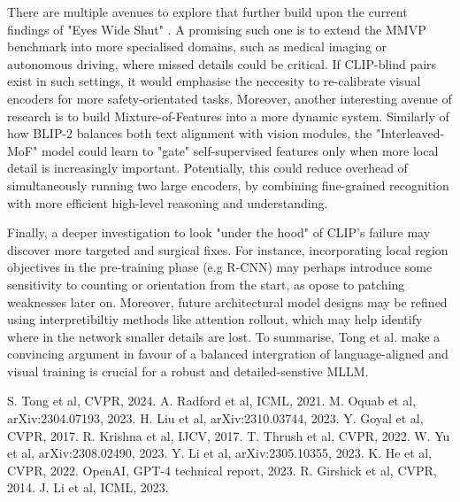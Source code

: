 \documentclass[11pt]{article}
\begin{document}
There are multiple avenues to explore that further build upon the current findings of "Eyes Wide Shut" \cite{Tong2024CVPR}. A promising such one is to extend the MMVP benchmark into more specialised domains, such as medical imaging or autonomous driving, where missed details could be critical. If CLIP-blind pairs exist in such settings, it would emphasise the neccesity to re-calibrate visual encoders for more safety-orientated tasks.
Moreover, another interesting avenue of research is to build Mixture-of-Features into a more dynamic system. Similarly of how BLIP-2 \cite{Li2023ICML_BLIP2} balances both text alignment with vision modules, the "Interleaved-MoF" model could learn to "gate" self-supervised features only when more local detail is increasingly important. Potentially, this could reduce overhead of simultaneously running two large encoders, by combining fine-grained recognition with more efficient high-level reasoning and understanding.

Finally, a deeper investigation to look "under the hood" of CLIP's failure may discover more targeted and surgical fixes. For instance, incorporating local region objectives in the pre-training phase (e.g R-CNN) may perhaps introduce some sensitivity to counting or orientation from the start, as opose to patching weaknesses later on. 
Moreover, future architectural model designs may be refined using interpretibiltiy methods like attention rollout, which may help identify where in the network smaller details are lost.
To summarise, Tong et al. make a convincing argument in favour of a balanced intergration of language-aligned and visual training is crucial for a robust and detailed-senstive MLLM.

\begin{small}
    \begin{thebibliography}{99}
        \setlength{\itemsep}{0.1em}  
        \setlength{\parskip}{0pt}     
         S. Tong et al, CVPR, 2024.
         A. Radford et al, ICML, 2021.
         M. Oquab et al, arXiv:2304.07193, 2023.
         H. Liu et al, arXiv:2310.03744, 2023.
         Y. Goyal et al, CVPR, 2017.
         R. Krishna et al, IJCV, 2017.
         T. Thrush et al, CVPR, 2022.
         W. Yu et al, arXiv:2308.02490, 2023.
         Y. Li et al, arXiv:2305.10355, 2023.
         K. He et al, CVPR, 2022.
         OpenAI, GPT-4 technical report, 2023.
         R. Girshick et al, CVPR, 2014.
         J. Li et al, ICML, 2023.
    \end{thebibliography}
    \end{small}
    
\end{document}
